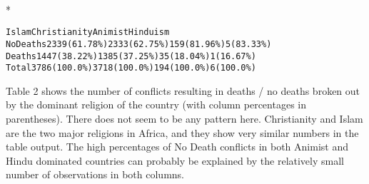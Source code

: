 \documentclass[letterpaper,10pt,english]{/usr/share/sphinx/texinputs/sphinxhowto}
\def\smaller{\fontsize{9.5pt}{9.5pt}\selectfont}
\newenvironment{InvisibleVerbatim}
        {\begin{mdframed}[leftmargin=0.1\linewidth,innerleftmargin=3pt,innerrightmargin=3pt, userdefinedwidth=1\linewidth, linewidth=0pt, linecolor=white, usetwoside=false]}
        {\end{mdframed}}
\begin{document}
                \makebox[0.1\linewidth]{\smaller\hfill\tt\color{nbframe-out-prompt}Out\hspace{4pt}{[}22{]}:\hspace{4pt}}\\*
                \vspace{-2.55\baselineskip}\begin{InvisibleVerbatim}
                \vspace{-0.5\baselineskip}
\begin{alltt}                   Islam   Christianity       Animist    Hinduism
No Deaths  2339 (61.78\%)  2333 (62.75\%)  159 (81.96\%)  5 (83.33\%)
Deaths     1447 (38.22\%)  1385 (37.25\%)   35 (18.04\%)  1 (16.67\%)
Total      3786 (100.0\%)  3718 (100.0\%)  194 (100.0\%)  6 (100.0\%)\end{alltt}

            \end{InvisibleVerbatim}
            
        
    
Table 2 shows the number of conflicts resulting in deaths / no deaths
broken out by the dominant religion of the country (with column
percentages in parentheses). There does not seem to be any pattern here.
Christianity and Islam are the two major religions in Africa, and they
show very similar numbers in the table output. The high percentages of
No Death conflicts in both Animist and Hindu dominated countries can
probably be explained by the relatively small number of observations in
both columns.

\end{document}
